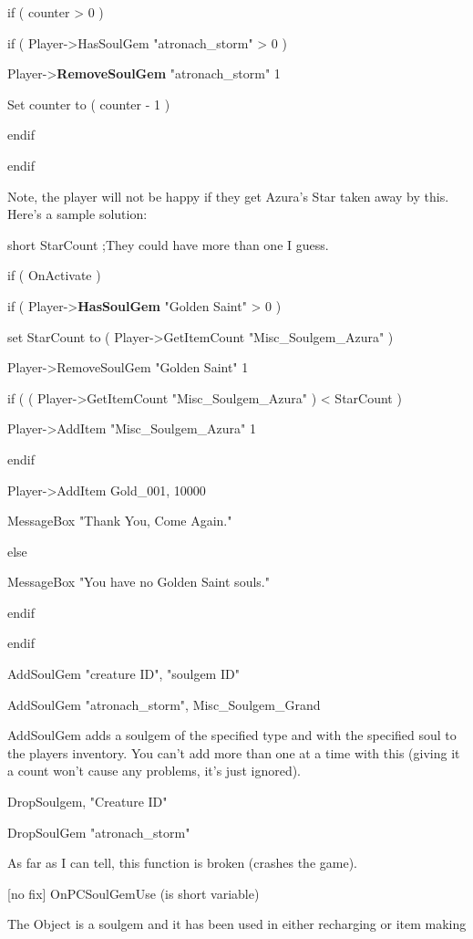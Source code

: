 if ( counter \textgreater{} 0 )

if ( Player-\textgreater HasSoulGem "atronach\_storm" \textgreater{} 0 )

Player-\textgreater{}\textbf{RemoveSoulGem} "atronach\_storm" 1

Set counter to ( counter - 1 )

endif

endif

Note, the player will not be happy if they get Azura's Star taken away
by this. Here's a sample solution:

short StarCount ;They could have more than one I guess.

if ( OnActivate )

if ( Player-\textgreater{}\textbf{HasSoulGem} "Golden Saint"
\textgreater{} 0 )

set StarCount to ( Player-\textgreater GetItemCount
"Misc\_Soulgem\_Azura" )

Player-\textgreater RemoveSoulGem "Golden Saint" 1

if ( ( Player-\textgreater GetItemCount "Misc\_Soulgem\_Azura" )
\textless{} StarCount )

Player-\textgreater AddItem "Misc\_Soulgem\_Azura" 1

endif

Player-\textgreater AddItem Gold\_001, 10000

MessageBox "Thank You, Come Again."

else

MessageBox "You have no Golden Saint souls."

endif

endif

AddSoulGem "creature ID", "soulgem ID"

AddSoulGem "atronach\_storm", Misc\_Soulgem\_Grand

AddSoulGem adds a soulgem of the specified type and with the specified
soul to the players inventory. You can't add more than one at a time
with this (giving it a count won't cause any problems, it's just
ignored).

DropSoulgem, "Creature ID"

DropSoulGem "atronach\_storm"

As far as I can tell, this function is broken (crashes the game).

{[}no fix{]} OnPCSoulGemUse (is short variable)

The Object is a soulgem and it has been used in either recharging or
item making

